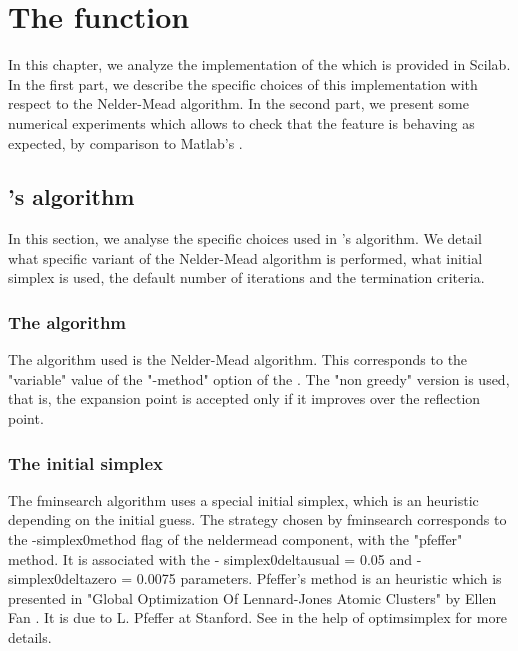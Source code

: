 \chapter{The  function}

In this chapter, we analyze the implementation of the 
which is provided in Scilab. In the first part, we describe the specific 
choices of this implementation with respect to the Nelder-Mead algorithm.
In the second part, we present some numerical experiments which 
allows to check that the feature is behaving as expected, by comparison 
to Matlab's .

\section{'s algorithm}

In this section, we analyse the specific choices used in 
's algorithm. We detail what specific variant
of the Nelder-Mead algorithm is performed, what initial simplex is used,
the default number of iterations and the termination criteria.

\subsection{The algorithm}

The algorithm used is the Nelder-Mead algorithm. This corresponds to the 
"variable" value of the "-method" option of the .
The "non greedy" version is used, that is, the expansion point is 
accepted only if it improves over the reflection point.

\subsection{The initial simplex}

The fminsearch algorithm uses a special initial simplex, which is an 
heuristic depending on the initial guess. The strategy chosen by 
fminsearch corresponds to the -simplex0method flag of the neldermead 
component, with the "pfeffer" method. It is associated with the -
simplex0deltausual = 0.05 and -simplex0deltazero = 0.0075 parameters. 
Pfeffer's method is an heuristic which is presented in "Global 
Optimization Of Lennard-Jones Atomic Clusters" by Ellen Fan \cite{Fan2002}. 
It is due to L. Pfeffer at Stanford. See in the help of optimsimplex for more 
details.

